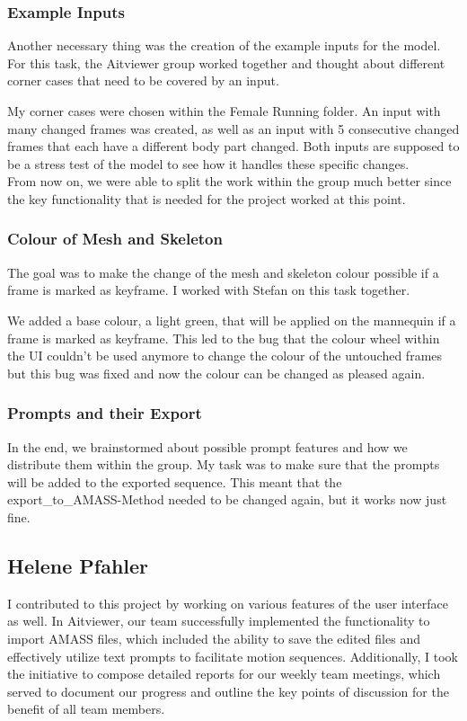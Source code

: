 \documentclass[a4paper]{scrartcl}
\begin{document}
\subsubsection*{Example Inputs}
Another necessary thing was the creation of the example inputs for the model. For this task, the Aitviewer group worked together and thought about different corner cases that need to be covered by an input. 

My corner cases were chosen within the Female Running folder. An input with many changed frames was created, as well as an input with 5 consecutive changed frames that each have a different body part changed. Both inputs are supposed to be a stress test of the model to see how it handles these specific changes.\\

From now on, we were able to split the work within the group much better since the key functionality that is needed for the project worked at this point. 

\subsubsection*{Colour of Mesh and Skeleton}
The goal was to make the change of the mesh and skeleton colour possible if a frame is marked as keyframe. I worked with Stefan on this task together.

We added a base colour, a light green, that will be applied on the mannequin if a frame is marked as keyframe. This led to the bug that the colour wheel within the UI couldn't be used anymore to change the colour of the untouched frames but this bug was fixed and now the colour can be changed as pleased again.

\subsubsection*{Prompts and their Export}
In the end, we brainstormed about possible prompt features and how we distribute them within the group. My task was to make sure that the prompts will be added to the exported sequence. This meant that the export\_to\_AMASS-Method needed to be changed again, but it works now just fine.  


\subsection*{Helene Pfahler}
I contributed to this project by working on various features of the user interface as well. In Aitviewer, our team successfully implemented the functionality to import AMASS files, which included the ability to save the edited files and effectively utilize text prompts to facilitate motion sequences.  
Additionally, I took the initiative to compose detailed reports for our weekly team meetings, which served to document our progress and outline the key points of discussion for the benefit of all team members.  
\end{document}
